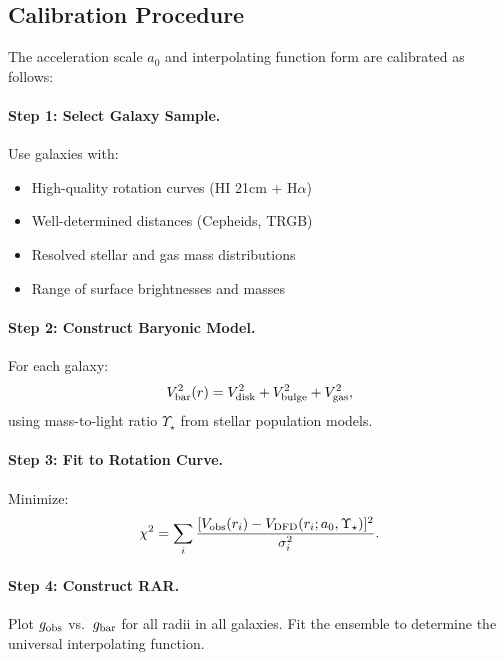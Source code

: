 \subsection{Calibration Procedure}\label{app:mu_calibration}

The acceleration scale $a_0$ and interpolating function form are calibrated 
as follows:

\paragraph{Step 1: Select Galaxy Sample.}
Use galaxies with:
\begin{itemize}
\item High-quality rotation curves (HI 21cm + H$\alpha$)
\item Well-determined distances (Cepheids, TRGB)
\item Resolved stellar and gas mass distributions
\item Range of surface brightnesses and masses
\end{itemize}

\paragraph{Step 2: Construct Baryonic Model.}
For each galaxy:
\begin{equation}
V_{\rm bar}^2(r) = V_{\rm disk}^2 + V_{\rm bulge}^2 + V_{\rm gas}^2,
\end{equation}
using mass-to-light ratio $\Upsilon_\star$ from stellar population models.

\paragraph{Step 3: Fit to Rotation Curve.}
Minimize:
\begin{equation}
\chi^2 = \sum_i \frac{[V_{\rm obs}(r_i) - V_{\rm DFD}(r_i; a_0, \Upsilon_\star)]^2}{\sigma_i^2}.
\end{equation}

\paragraph{Step 4: Construct RAR.}
Plot $g_{\rm obs}$ vs.\ $g_{\rm bar}$ for all radii in all galaxies. 
Fit the ensemble to determine the universal interpolating function.

